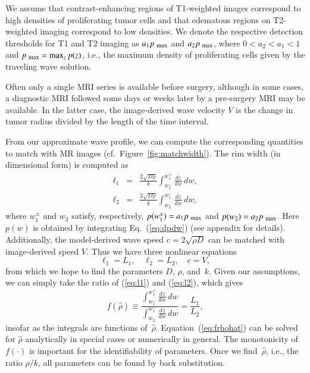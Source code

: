 \documentclass{aims}
\numberwithin{equation}{section}
\begin{document}
We assume that contrast-enhancing regions of T1-weighted images
correspond to high densities of proliferating tumor cells and that edematous
regions on T2-weighted imaging correspond to low densities.  We denote the
respective detection thresholds for T1 and T2 imaging as
$a_1p_{\mbox{\scriptsize max}}$ and $a_2 p_{\mbox{\scriptsize max}}$,
where $0 < a_2 < a_1 < 1$ and 
$p_{\mbox{\scriptsize max}}=\max_{z} p(z)$,
i.e., the maximum density of proliferating cells given by the traveling wave
solution.

Often only a single MRI series is available before surgery, although in some
cases, a diagnostic MRI followed some days or weeks later by a pre-surgery MRI
may be available.  In the latter case, the
image-derived wave velocity $V$ is the change in tumor radius divided
by the length of the time interval.

From our approximate wave profile, we can compute the corresponding
quantities to match with MR images (cf.\ Figure~\ref{fig:matchwidth}). The
rim width (in dimensional form) is computed as
\begin{subequations}
\begin{eqnarray}
\ell_{1} & = & \frac{2\sqrt{D\rho}}{k}
  \int_{w_{1}^{-}}^{w_{1}^+} \frac{dz}{dw} \,dw,\label{eq:l1}\\
\ell_{2} & = & \frac{2\sqrt{D\rho}}{k}
  \int_{w_{2}}^{w_{1}^-} \frac{dz}{dw}\, dw,\label{eq:l2}
\end{eqnarray}
\end{subequations}
where $w_{1}^{\pm}$ and $w_{2}$ satisfy, respectively,
$p(w_{1}^{\pm})=a_{1}p_{\mbox{\scriptsize max}}$ and
$p(w_{2})=a_{2}p_{\mbox{\scriptsize max}}$.  Here
$p(w)$ is obtained by integrating Eq.~(\ref{eq:dpdw}) (see appendix for details).
Additionally, the model-derived wave speed $c=2\sqrt{\rho D}$
can be matched with image-derived speed
$V$. Thus we have three nonlinear equations
\begin{equation}
\ell_{1}=L_{1},\quad \ell_{2}=L_{2},\quad c=V,
\label{eq:l1l2c}
\end{equation}
from which we hope to find the parameters $D$, $\rho$, and~$k$.  Given our
assumptions, we can simply take the ratio of
(\ref{eq:l1}) and (\ref{eq:l2}), which gives
\begin{equation}
f(\hat{\rho})\equiv
\frac{\displaystyle\int_{w_{1}^{-}}^{w_{1}^{+}}\frac{dz}{dw}\,dw}
  {\displaystyle\int_{w_{2}}^{w_{1}^{-}}\frac{dz}{dw}\,dw}=
  \frac{L_{1}}{L_{2}},
\label{eq:frhohat}
\end{equation}
insofar as the integrals are functions of~$\hat{\rho}$. 
Equation~(\ref{eq:frhohat})
can be solved for $\hat{\rho}$ analytically in special cases or numerically
in general.  The monotonicity of $f(\cdot)$ is important
for the identifiability of parameters. Once we find~$\hat{\rho}$, i.e., the ratio 
$\rho/k$, all parameters can be found by back substitution.
\end{document}
